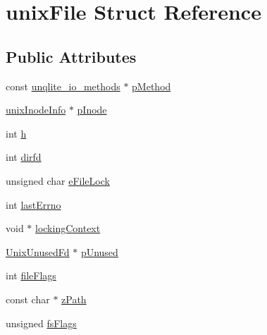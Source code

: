 \hypertarget{structunix_file}{\section{unix\-File Struct Reference}
\label{dd/d32/structunix_file}
}
\subsection*{Public Attributes}
\begin{DoxyCompactItemize}
\item 
const \hyperlink{structunqlite__io__methods}{unqlite\-\_\-io\-\_\-methods} $\ast$ \hyperlink{structunix_file_a322547d6028b2583ff0eb244717d970e}{p\-Method}
\item 
\hyperlink{structunix_inode_info}{unix\-Inode\-Info} $\ast$ \hyperlink{structunix_file_ac17292fe29bb6cc9eceed9db6d1209e8}{p\-Inode}
\item 
int \hyperlink{structunix_file_a1c58798d4ff3ac6232765c8b76bb7450}{h}
\item 
int \hyperlink{structunix_file_aa4d81dba57e69451d4bc2c4593faaef6}{dirfd}
\item 
unsigned char \hyperlink{structunix_file_a001e59bdb9d3f396952c2c8e3229f7fc}{e\-File\-Lock}
\item 
int \hyperlink{structunix_file_afde57c2e118fac8041918dac2ee6f7d1}{last\-Errno}
\item 
void $\ast$ \hyperlink{structunix_file_afaeb4425a6de3e913db4b03e8a0d098a}{locking\-Context}
\item 
\hyperlink{struct_unix_unused_fd}{Unix\-Unused\-Fd} $\ast$ \hyperlink{structunix_file_a3820ccead5805d2ea61ca1c752646852}{p\-Unused}
\item 
int \hyperlink{structunix_file_a43e6df5096c2a58cb009b7c407f7cfeb}{file\-Flags}
\item 
const char $\ast$ \hyperlink{structunix_file_afc5eff0948d553308cf90a79d4a06f17}{z\-Path}
\item 
unsigned \hyperlink{structunix_file_ab24cd99aef6872bdf36074ec00885993}{fs\-Flags}
\end{DoxyCompactItemize}


